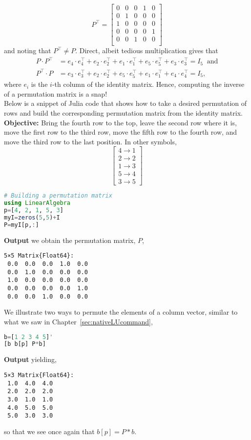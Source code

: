 $$
P^\top=\begin{bmatrix}
0&0&0&1&0\\ %
0&1&0&0&0\\ %
1&0&0&0&0\\ %
0&0&0&0&1\\ %
0&0&1&0&0\\ %
\end{bmatrix}
$$
and noting that $P^\top \neq P$. Direct, albeit tedious multiplication gives that 
\begin{align*}
P \cdot P^\top &= e_4\cdot e_4^\top + e_2\cdot e_2^\top + e_1\cdot e_1^\top + e_5\cdot e_5^\top + e_3\cdot e_3^\top = I_5~\text{ and}\\
P^\top \cdot P &= e_3\cdot e_3^\top + e_2\cdot e_2^\top + e_5\cdot e_5^\top + e_1\cdot e_1^\top + e_4\cdot e_4^\top = I_5,
\end{align*}
where $e_i$ is the $i$-th column of the identity matrix. Hence, computing the inverse of a permutation matrix is a snap!\\

Below is a snippet of Julia code that shows how to take a desired permutation of rows and build the corresponding permutation matrix from the identity matrix. \\

\textbf{Objective:}  Bring the fourth row to the top, leave the second row where it is, move the first row to the third row, move the fifth row to the fourth row, and move the third row to the last position. In other symbols,
$$\left[\begin{array}{r} 4 \rightarrow 1 \\2 \rightarrow 2 \\1 \rightarrow 3 \\ 5 \rightarrow 4 \\ 3 \rightarrow 5\end{array} \right] $$
\begin{lstlisting}[language=Julia]
# Building a permutation matrix
using LinearAlgebra
p=[4, 2, 1, 5, 3]
myI=zeros(5,5)+I
P=myI[p,:]
\end{lstlisting}
\textbf{Output} we obtain the permutation matrix, $P$,
\begin{verbatim}
5×5 Matrix{Float64}:
 0.0  0.0  0.0  1.0  0.0
 0.0  1.0  0.0  0.0  0.0
 1.0  0.0  0.0  0.0  0.0
 0.0  0.0  0.0  0.0  1.0
 0.0  0.0  1.0  0.0  0.0
 \end{verbatim}
We illustrate two ways to permute the elements of a column vector, similar to what we saw in Chapter~\ref{sec:nativeLUcommand},
 \begin{lstlisting}[language=Julia]
b=[1 2 3 4 5]'
[b b[p] P*b]
\end{lstlisting}
\textbf{Output} yielding,
\begin{verbatim}
5×3 Matrix{Float64}:
 1.0  4.0  4.0
 2.0  2.0  2.0
 3.0  1.0  1.0
 4.0  5.0  5.0
 5.0  3.0  3.0
 \end{verbatim}
 so that we see once again that $b[p]=P*b$. 
 
